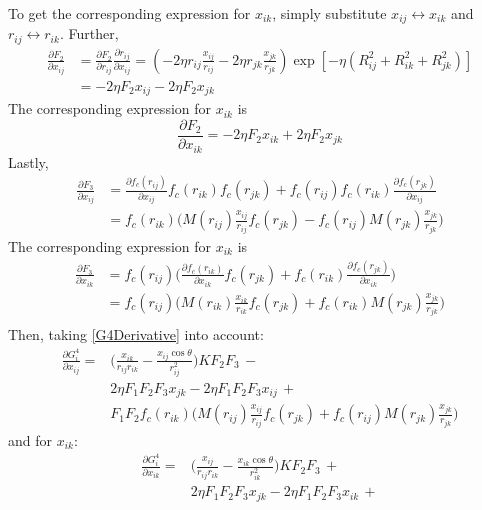 \documentclass[twoside,english]{uiofysmaster}
\begin{document}
\begin{appendices}
To get the corresponding expression for $x_{ik}$, simply substitute $x_{ij} \leftrightarrow x_{ik}$ and 
$r_{ij} \leftrightarrow r_{ik}$. Further, 
\begin{align}
 \frac{\partial F_2}{\partial x_{ij}} &= \frac{\partial F_2}{\partial r_{ij}}\frac{\partial r_{ij}}{\partial x_{ij}}  = 
 (-2\eta r_{ij}\frac{x_{ij}}{r_{ij}} - 2\eta r_{jk}\frac{x_{jk}}{r_{jk}})\exp[-\eta (R_{ij}^2 + R_{ik}^2 + R_{jk}^2)] \\
 &= -2\eta F_2 x_{ij} - 2\eta F_2 x_{jk}
\end{align}
The corresponding expression for $x_{ik}$ is
\begin{equation}
 \frac{\partial F_2}{\partial x_{ik}} = 
 -2\eta F_2 x_{ik} + 2\eta F_2 x_{jk}
\end{equation}
Lastly, 
\begin{align}
 \frac{\partial F_3}{\partial x_{ij}} &=  \frac{\partial f_c(r_{ij})}{\partial x_{ij}}
 f_c(r_{ik}) f_c(r_{jk}) + f_c(r_{ij})f_c(r_{ik})\frac{\partial f_c(r_{jk})}{\partial x_{ij}} \\
 &= f_c(r_{ik})\Biggr(M(r_{ij})\frac{x_{ij}}{r_{ij}}f_c(r_{jk}) - 
 f_c(r_{ij}) M(r_{jk})\frac{x_{jk}}{r_{jk}} \Biggr)
\end{align}
The corresponding expression for $x_{ik}$ is
\begin{align}
 \frac{\partial F_3}{\partial x_{ik}} &= f_c(r_{ij})\Biggr(\frac{\partial f_c(r_{ik})}{\partial x_{ik}}f_c(r_{jk}) + 
 f_c(r_{ik}) \frac{\partial f_c(r_{jk})}{\partial x_{ik}} \Biggr) \\
 &= f_c(r_{ij})\Biggr(M(r_{ik})\frac{x_{ik}}{r_{ik}}f_c(r_{jk}) + 
 f_c(r_{ik}) M(r_{jk})\frac{x_{jk}}{r_{jk}} \Biggr) \\
\end{align}
Then, taking \eqref{G4Derivative} into account:
\begin{align}
 \frac{\partial G_i^4}{\partial x_{ij}} = &\biggr(\frac{x_{ik}}{r_{ij}r_{ik}} - \frac{x_{ij}\cos\theta}{r_{ij}^2}
 \biggr)KF_2F_3 \, - \\ &2\eta F_1F_2F_3 x_{jk} - 2\eta F_1F_2F_3 x_{ij} \, + \\
 &F_1F_2 f_c(r_{ik})\Biggr(M(r_{ij})\frac{x_{ij}}{r_{ij}}f_c(r_{jk}) +
 f_c(r_{ij}) M(r_{jk})\frac{x_{jk}}{r_{jk}} \Biggr)
\end{align}
and for $x_{ik}$:
\begin{align}
 \frac{\partial G_i^4}{\partial x_{ik}} = &\biggr(\frac{x_{ij}}{r_{ij}r_{ik}} - \frac{x_{ik}\cos\theta}{r_{ik}^2}
 \biggr)KF_2F_3 \, + \\ &2\eta F_1F_2F_3 x_{jk} - 2\eta F_1F_2F_3 x_{ik} \, + \\

\end{align}
\end{appendices}
\end{document}
